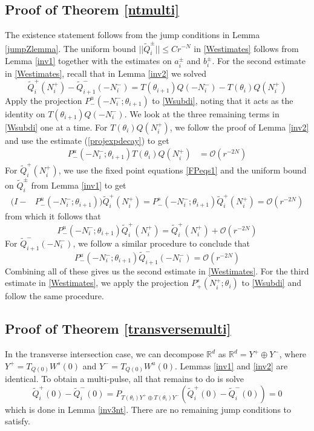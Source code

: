 \documentclass[12pt]{elsarticle}
\def\R{{\mathbb R}}
\begin{document}
\subsection{Proof of Theorem \ref{ntmulti}}

The existence statement follows from the jump conditions in Lemma \ref{jumpZlemma}. The uniform bound $||\tilde{Q}_i^\pm|| \leq C r^{-N}$ in \eqref{Westimates} follows from Lemma \ref{inv1} together with the estimates on $a_i^\pm$ and $b_i^\pm$. For the second estimate in \eqref{Westimates}, recall that in Lemma \ref{inv2} we solved
\begin{equation}\label{Wsubdi}
\tilde{Q}_i^+(N_i^+) - \tilde{Q}_{i+1}^-(-N_i^-) = T(\theta_{i+1}) Q(-N_i^-) - T(\theta_i) Q(N_i^+)
\end{equation}
Apply the projection $P^u_-(-N_i^-; \theta_{i+1})$ to \eqref{Wsubdi}, noting that it acts as the identity on $T(\theta_{i+1}) Q(-N_i^-)$. We look at the three remaining terms in \eqref{Wsubdi} one at a time. For $T(\theta_i) Q(N_i^+)$, we follow the proof of Lemma \ref{inv2} and use the estimate (\ref{projexpdecay}) to get
\begin{align*}
P^u_-(-N_i^-; \theta_{i+1})T(\theta_i) Q(N_i^+)
&= \mathcal{O}(r^{-2N})
\end{align*}
For $\tilde{Q}_i^+(N_i^+)$, we use the fixed point equations \eqref{FPeqs1} and the uniform bound on $\tilde{Q}_i^\pm$ from Lemma \ref{inv1} to get
\begin{align*}
(I - &P^u_-(-N_i^-; \theta_{i+1})) \tilde{Q}_i^+(N_i^+) = P^s_-(-N_i^-; \theta_{i+1}) \tilde{Q}_i^+(N_i^+) = \mathcal{O}(r^{-2N})
\end{align*}
from which it follows that
\[
P^u_-(-N_i^-; \theta_{i+1}) \tilde{Q}_i^+(N_i^+) = \tilde{Q}_i^+(N_i^+) + \mathcal{O}(r^{-2N})
\]
For $\tilde{Q}_{i+1}^-(-N_i^-)$, we follow a similar procedure to conclude that
\[
P^u_-(-N_i^-; \theta_{i+1}) \tilde{Q}_{i+1}^-(-N_i^-) = \mathcal{O}(r^{-2N})
\]
Combining all of these gives us the second estimate in \eqref{Westimates}. For the third estimate in \eqref{Westimates}, we apply the projection $P^s_+(N_i^+; \theta_i)$ to \eqref{Wsubdi} and follow the same procedure.

\subsection{Proof of Theorem \ref{transversemulti}}

In the transverse intersection case, we can decompose $\R^d$ as $\R^d = Y^+ \oplus Y^-$, where $Y^+ = T_{Q(0)} W^s(0)$ and $Y^- = T_{Q(0)} W^u(0)$. Lemmas \ref{inv1} and \ref{inv2} are identical. To obtain a multi-pulse, all that remains to do is solve 
\[
\tilde{Q}_i^+(0) - \tilde{Q}_i^-(0) = P_{T(\theta_i)Y^+ \oplus T(\theta_i)Y^-}( \tilde{Q}_i^+(0) - \tilde{Q}_i^-(0) ) = 0
\]
which is done in Lemma \ref{inv3nt}. There are no remaining jump conditions to satisfy.
\end{document}

